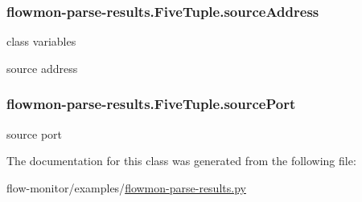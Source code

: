 \subsubsection[{\texorpdfstring{source\+Address}{sourceAddress}}]{\setlength{\rightskip}{0pt plus 5cm}flowmon-\/parse-\/results.\+Five\+Tuple.\+source\+Address}\hypertarget{classflowmon-parse-results_1_1FiveTuple_a96a23657f51c64ceecf3530bad2a2573}{}\label{classflowmon-parse-results_1_1FiveTuple_a96a23657f51c64ceecf3530bad2a2573}


class variables

source address 

\subsubsection[{\texorpdfstring{source\+Port}{sourcePort}}]{\setlength{\rightskip}{0pt plus 5cm}flowmon-\/parse-\/results.\+Five\+Tuple.\+source\+Port}\hypertarget{classflowmon-parse-results_1_1FiveTuple_a1a880e7cbea1671266c4c48e3655a8a7}{}\label{classflowmon-parse-results_1_1FiveTuple_a1a880e7cbea1671266c4c48e3655a8a7}


source port 



The documentation for this class was generated from the following file\+:\begin{DoxyCompactItemize}
\item 
flow-\/monitor/examples/\hyperlink{flowmon-parse-results_8py}{flowmon-\/parse-\/results.\+py}\end{DoxyCompactItemize}
